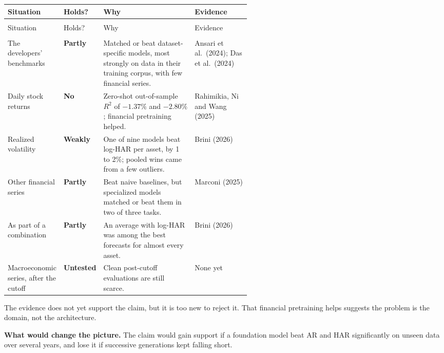 {\small
\begin{longtable}{@{}>{\raggedright\arraybackslash}p{0.19\linewidth}>{\raggedright\arraybackslash}p{0.13\linewidth}>{\raggedright\arraybackslash}p{}>{\raggedright\arraybackslash}p{0.23\linewidth}@{}}
\toprule
Situation & Holds? & Why & Evidence \\
\midrule
\endfirsthead
\multicolumn{4}{@{}l}{\emph{(continued)}} \\
\toprule
Situation & Holds? & Why & Evidence \\
\midrule
\endhead
\midrule
\multicolumn{4}{r@{}}{\emph{(continued on the next page)}} \\
\endfoot
\bottomrule
\endlastfoot
The developers' benchmarks & \textbf{Partly} & Matched or beat dataset-specific models, most strongly on data in their training corpus, with few financial series. & Ansari et al.\ (2024); Das et al.\ (2024) \\*
\addlinespace[3pt]
Daily stock returns & \textbf{No} & Zero-shot out-of-sample $R^2$ of $-1.37\%$ and $-2.80\%$; financial pretraining helped. & Rahimikia, Ni and Wang (2025) \\
\addlinespace[3pt]
Realized volatility & \textbf{Weakly} & One of nine models beat log-HAR per asset, by 1 to 2\%; pooled wins came from a few outliers. & Brini (2026) \\
\addlinespace[3pt]
Other financial series & \textbf{Partly} & Beat naive baselines, but specialized models matched or beat them in two of three tasks. & Marconi (2025) \\
\addlinespace[3pt]
As part of a combination & \textbf{Partly} & An average with log-HAR was among the best forecasts for almost every asset. & Brini (2026) \\*
\addlinespace[3pt]
Macroeconomic series, after the cutoff & \textbf{Untested} & Clean post-cutoff evaluations are still scarce. & None yet \\
\end{longtable}
\addtocounter{table}{-1}%
}

The evidence does not yet support the claim, but it is too new to reject it. That financial pretraining helps suggests the problem is the domain, not the architecture.

\textbf{What would change the picture.} The claim would gain support if a foundation model beat AR and HAR significantly on unseen data over several years, and lose it if successive generations kept falling short.

